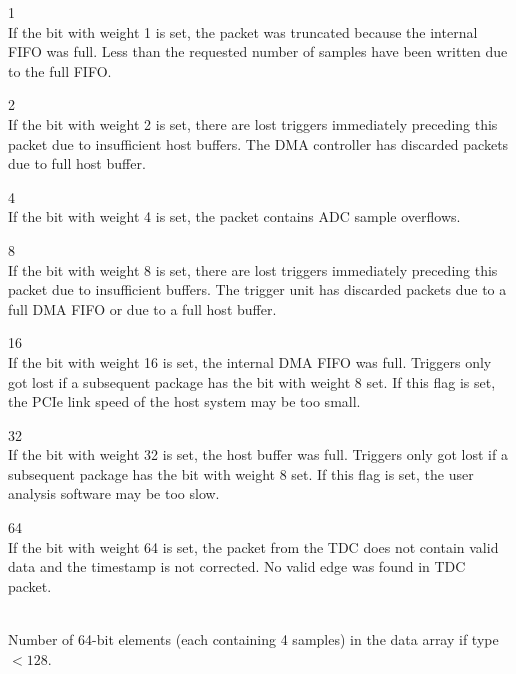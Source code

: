     \par
    \indent{} 1\\
    \indent If the bit with weight 1 is set, the packet was truncated because the internal FIFO was full. Less than the requested number of samples have been written due to the full FIFO.\par
    \indent{} 2\\
    \indent If the bit with weight 2 is set, there are lost triggers immediately preceding this packet due to insufficient host buffers. The DMA controller has discarded packets due to full host buffer.\par
    \indent{} 4\\
    \indent If the bit with weight 4 is set, the packet contains ADC sample overflows.\par
    \indent{} 8\\
    \indent If the bit with weight 8 is set, there are lost triggers immediately preceding this packet due to insufficient buffers. The trigger unit has discarded packets due to a full DMA FIFO or due to a full host buffer.\par
    \indent{} 16\\
    \indent If the bit with weight 16 is set, the internal DMA FIFO was full. Triggers only got lost if a subsequent package has the bit with weight 8 set. If this flag is set, the PCIe link speed of the host system may be too small.\par
    \indent{} 32\\
    \indent If the bit with weight 32 is set, the host buffer was full. Triggers only got lost if a subsequent package has the bit with weight 8 set. If this flag is set, the user analysis software may be too slow.\par
    \indent{} 64\\
    \indent If the bit with weight 64 is set, the packet from the TDC does not contain valid data and the timestamp is not corrected. No valid edge was found in TDC packet.\par

    \\
    Number of 64-bit elements (each containing 4 samples) in the data array if type $< 128$.\par

